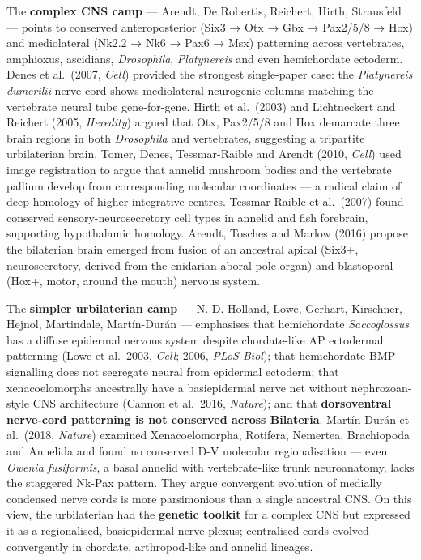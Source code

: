 The \textbf{complex CNS camp} --- Arendt, De Robertis, Reichert, Hirth, Strausfeld --- points to conserved anteroposterior (Six3 → Otx → Gbx → Pax2/5/8 → Hox) and mediolateral (Nk2.2 → Nk6 → Pax6 → Msx) patterning across vertebrates, amphioxus, ascidians, \emph{Drosophila}, \emph{Platynereis} and even hemichordate ectoderm. Denes et al.~(2007, \emph{Cell}) provided the strongest single-paper case: the \emph{Platynereis dumerilii} nerve cord shows mediolateral neurogenic columns matching the vertebrate neural tube gene-for-gene. Hirth et al.~(2003) and Lichtneckert and Reichert (2005, \emph{Heredity}) argued that Otx, Pax2/5/8 and Hox demarcate three brain regions in both \emph{Drosophila} and vertebrates, suggesting a tripartite urbilaterian brain. Tomer, Denes, Tessmar-Raible and Arendt (2010, \emph{Cell}) used image registration to argue that annelid mushroom bodies and the vertebrate pallium develop from corresponding molecular coordinates --- a radical claim of deep homology of higher integrative centres. Tessmar-Raible et al.~(2007) found conserved sensory-neurosecretory cell types in annelid and fish forebrain, supporting hypothalamic homology. Arendt, Tosches and Marlow (2016) propose the bilaterian brain emerged from fusion of an ancestral apical (Six3+, neurosecretory, derived from the cnidarian aboral pole organ) and blastoporal (Hox+, motor, around the mouth) nervous system.

The \textbf{simpler urbilaterian camp} --- N. D. Holland, Lowe, Gerhart, Kirschner, Hejnol, Martindale, Martín-Durán --- emphasises that hemichordate \emph{Saccoglossus} has a diffuse epidermal nervous system despite chordate-like AP ectodermal patterning (Lowe et al.~2003, \emph{Cell}; 2006, \emph{PLoS Biol}); that hemichordate BMP signalling does not segregate neural from epidermal ectoderm; that xenacoelomorphs ancestrally have a basiepidermal nerve net without nephrozoan-style CNS architecture (Cannon et al.~2016, \emph{Nature}); and that \textbf{dorsoventral nerve-cord patterning is not conserved across Bilateria}. Martín-Durán et al.~(2018, \emph{Nature}) examined Xenacoelomorpha, Rotifera, Nemertea, Brachiopoda and Annelida and found no conserved D-V molecular regionalisation --- even \emph{Owenia fusiformis}, a basal annelid with vertebrate-like trunk neuroanatomy, lacks the staggered Nk-Pax pattern. They argue convergent evolution of medially condensed nerve cords is more parsimonious than a single ancestral CNS. On this view, the urbilaterian had the \textbf{genetic toolkit} for a complex CNS but expressed it as a regionalised, basiepidermal nerve plexus; centralised cords evolved convergently in chordate, arthropod-like and annelid lineages.

